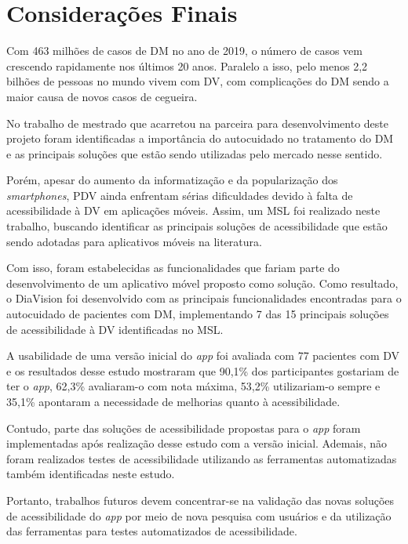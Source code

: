 \chapter{Considerações Finais}
\label{ch:conclusion}

Com 463 milhões de casos de DM no ano de 2019, o número de casos vem crescendo rapidamente nos últimos 20 anos.
Paralelo a isso, pelo menos 2,2 bilhões de pessoas no mundo vivem com DV\@, com complicações do DM sendo
a maior causa de novos casos de cegueira.

No trabalho de mestrado que acarretou na parceira para desenvolvimento deste projeto foram identificadas a importância
do autocuidado no tratamento do DM e as principais soluções que estão sendo utilizadas pelo mercado nesse sentido.

Porém, apesar do aumento da informatização e da popularização dos \emph{smartphones},
PDV ainda enfrentam sérias dificuldades devido à falta de acessibilidade à DV em aplicações móveis. Assim, um MSL foi realizado
neste trabalho, buscando identificar as principais soluções de acessibilidade que estão sendo adotadas para
aplicativos móveis na literatura. 

Com isso, foram estabelecidas as funcionalidades que fariam parte do desenvolvimento de um aplicativo
móvel proposto como solução. Como resultado, o DiaVision foi desenvolvido com as principais
funcionalidades encontradas para o autocuidado de pacientes com DM, implementando 7 das 15 principais soluções
de acessibilidade à DV identificadas no MSL\@.

A usabilidade de uma versão inicial do \emph{app} foi avaliada com 77 pacientes com DV e os resultados
desse estudo mostraram que 90,1\% dos participantes gostariam de ter o \emph{app}, 62,3\% avaliaram-o com nota
máxima, 53,2\% utilizariam-o sempre e 35,1\% apontaram a necessidade de melhorias quanto à acessibilidade.

Contudo, parte das soluções de acessibilidade propostas para o \emph{app} foram implementadas após realização
desse estudo com a versão inicial. Ademais, não foram realizados testes de acessibilidade utilizando
as ferramentas automatizadas também identificadas neste estudo.

Portanto, trabalhos futuros devem concentrar-se na validação das novas soluções de acessibilidade do \emph{app}
por meio de nova pesquisa com usuários e da utilização das ferramentas para testes automatizados de acessibilidade.